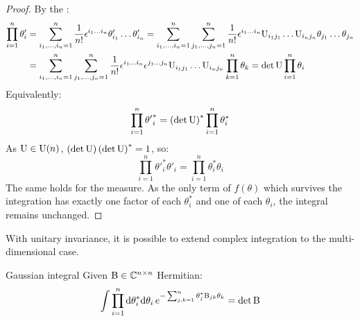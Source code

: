 \begin{proofbox}
  \begin{proof}
    By the :
    \begin{equation*}
      \begin{split}
        \prod_{i = 1}^n \theta'_i
        & = \sum_{i_1, \dots, i_n = 1}^n \frac{1}{n!} \epsilon^{i_1 \dots i_n} \theta'_{i_1} \dots \theta'_{i_n} = \sum_{i_1, \dots, i_n = 1}^n \sum_{j_1, \dots, j_n = 1}^n \frac{1}{n!} \epsilon^{i_1 \dots i_n} \mathrm{U}_{i_1 j_1} \dots \mathrm{U}_{i_n j_n} \theta_{j_1} \dots \theta_{j_n} \\
        & = \sum_{i_1, \dots, i_n = 1}^n \sum_{j_1, \dots, j_n = 1}^n \frac{1}{n!} \epsilon^{i_1 \dots i_n} \epsilon^{j_1 \dots j_n} \mathrm{U}_{i_1 j_1} \dots \mathrm{U}_{i_n j_n} \prod_{k = 1}^n \theta_k = \det \mathrm{U} \prod_{i = 1}^n \theta_i
      \end{split}
    \end{equation*}
    Equivalently:
    \begin{equation*}
      \prod_{i = 1}^n {\theta'}^*_i = \left( \det \mathrm{U} \right)^* \prod_{i = 1}^n \theta_i^*
    \end{equation*}
    As $ \mathrm{U} \in \mathrm{U}(n) $, $ \left( \det \mathrm{U} \right) \left( \det \mathrm{U} \right)^* = 1 $, so:
    \begin{equation*}
      \prod_{i = 1}^n {\theta'}^*_i \theta'_i = \prod_{i = 1}^n \theta_i^* \theta_i
    \end{equation*}
    The same holds for the measure. As the only term of $ f(\theta) $ which survives the integration has exactly one factor of each $ \theta_i^* $ and one of each $ \theta_i $, the integral remains unchanged.
  \end{proof}
\end{proofbox}

With unitary invariance, it is possible to extend complex integration to the multi-dimensional case.

\begin{lemma}{Gaussian integral}{}
  Given $ \mathrm{B} \in \mathbb{C}^{n \times n} $ Hermitian:
  \begin{equation}
    \int \prod_{i = 1}^n \mathrm{d} \theta^*_i \mathrm{d} \theta_i\, e^{- \sum_{j,k = 1}^n \theta_j^* \mathrm{B}_{jk} \theta_k} = \det \mathrm{B}
    \label{eq:grass-gauss-1}
  \end{equation}
\end{lemma}

